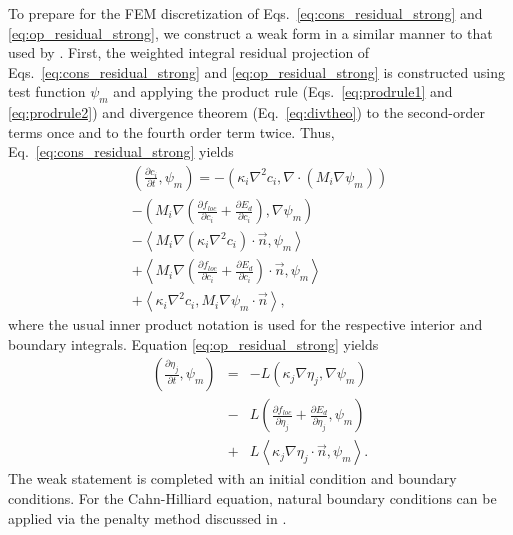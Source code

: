 \documentclass[letter,12pt,fleqn]{article}
\begin{document}
To prepare for the FEM discretization of Eqs.~\eqref{eq:cons_residual_strong} and \eqref{eq:op_residual_strong}, we construct a weak form in a similar manner to that used by \citet{stogner2008}.  First, the weighted integral residual projection of Eqs.~\eqref{eq:cons_residual_strong} and \eqref{eq:op_residual_strong} is constructed using test function $\psi_m$ and applying the product rule (Eqs.~\eqref{eq:prodrule1} and \eqref{eq:prodrule2}) and divergence theorem (Eq.~\eqref{eq:divtheo}) to the second-order terms once and to the fourth order term twice.  Thus, Eq.~\eqref{eq:cons_residual_strong} yields
\begin{eqnarray}
	\left(  \frac{\partial c_i}{\partial t}, \psi_m \right) =  -\left( \kappa_i \nabla^2 c_i, \nabla \cdot (M_i \nabla \psi_m ) \right) \nonumber \\ 
	-\left( M_i  \nabla \left( \frac{\partial f_{loc} }{\partial c_i} + \frac{\partial E_d}{\partial c_i} \right), \nabla \psi_m \right)  \nonumber \\
	- \left< M_i \nabla \left(  \kappa_i \nabla^2 c_i  \right)  \cdot \vec{n}, \psi_m \right> \nonumber \\
	+ \left< M_i \nabla \left( \frac{\partial f_{loc}}{\partial c_i} + \frac{\partial E_{d}}{\partial c_i } \right)  \cdot \vec{n}, \psi_m \right> \nonumber \\ 
	+  \left< \kappa_i \nabla^2 c_i, M_i \nabla \psi_m \cdot \vec{n} \right>  \label{eq:cons_residual_weak}, 
\end{eqnarray}
where the usual inner product notation is used for the respective interior and boundary integrals.  Equation \eqref{eq:op_residual_strong} yields
\begin{eqnarray}
	\left(  \frac{\partial \eta_j}{\partial t}, \psi_m \right) &=& - L \left( \kappa_j \nabla \eta_j, \nabla \psi_m \right) \nonumber \\
	&-& L \left( \frac{\partial f_{loc}}{\partial \eta_j} + \frac{\partial E_d}{\partial \eta_j}, \psi_m \right) \nonumber \\
	&+& L\left<  \kappa_j \nabla \eta_j \cdot \vec{n}, \psi_m \right> \label{eq:op_residual_weak}.
\end{eqnarray}
The weak statement is completed with an initial condition and boundary conditions.  For the Cahn-Hilliard equation, natural boundary conditions can be applied via the penalty method discussed in \citet{stogner2008}.
\end{document}
